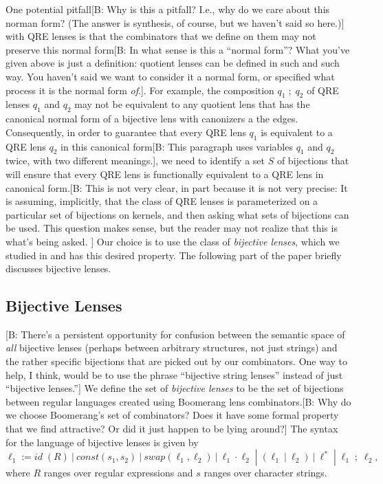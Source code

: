 \documentclass[acmsmall,review,anonymous]{acmart}
\newcommand{\FINISH}[3]{\ifdraft\textcolor{#1}{[#2: #3]}\fi}
\newcommand{\bcp}[1]{\FINISH{dkred}{B}{#1}}
\newcommand{\kw}[1]{\ensuremath{\mathit{#1}}}
\newcommand{\sep}{\ensuremath{\ | \ }}
\newcommand{\const}{\ensuremath{\kw{const}}}
\newcommand{\swap}{\ensuremath{\kw{swap}}}
\begin{document}
One potential pitfall\bcp{Why is this a pitfall?  I.e., why do we care about
this norman form?  (The answer is synthesis, of course, but we haven't said
so here.)} with QRE lenses is that the combinators that
we define on them may not preserve this normal form\bcp{In what sense is
  this a ``normal form''?  What you've given above is just a definition:
  quotient lenses can be defined in such and such way.  You haven't said we
  want to consider it a normal form, or specified what process it is the
  normal form {\em of}.}. For example, the
composition $q_1 \; ; \; q_2$ of QRE lenses $q_1$ and $q_2$ may not be
equivalent to any quotient lens that has the canonical normal form of a
bijective lens with canonizers a the edges. Consequently, in order to guarantee
that every QRE lens $q_1$ is equivalent to a QRE lens $q_2$ in this
canonical form\bcp{This paragraph uses variables $q_1$ and $q_2$ twice, with
two different meanings.}, we need to identify a set $S$ of bijections that
will ensure 
that every QRE lens is functionally equivalent to a QRE lens in canonical
form.\bcp{This is not very clear, in part because it is not very precise:
  It is assuming, implicitly, that the class of QRE lenses is 
  parameterized on a particular set of bijections on kernels, and then
  asking what sets of bijections can be used.  This question makes sense,
  but the reader may not realize that this is what's being asked. } 
Our choice is to use the class of \textit{bijective lenses}, which we studied in
\cite{optician} and has this desired property. The following part of the paper
briefly discusses bijective lenses.

\subsection{Bijective Lenses}
\bcp{There's a persistent opportunity for confusion between the semantic
  space of {\em all} bijective lenses (perhaps between arbitrary structures,
  not just strings) and the rather specific bijections that are picked out
  by our combinators.  One way to help, I think, would be to use the phrase
  ``bijective string lenses'' instead of just ``bijective lenses.''}
We define the set of \textit{bijective lenses} to be the set of bijections
between regular languages created using Boomerang lens combinators.\bcp{Why
  do we choose Boomerang's set of combinators?  Does it have some formal
  property that we find attractive?  Or did it just happen to be lying around?}
The syntax for the language of bijective lenses is given by
$$\ell_1 := \mathit{id} \; (R) \sep \const(s_1, s_2) \sep  \swap(\ell_1,
\ell_2) \sep \ell_1 \cdot \ell_2 \; |  \; (\ell_1 \sep \ell_2) \sep \ell^* \;
| \; \ell_1 \; ; \;  \ell_2,$$ where $R$ ranges over regular expressions and $s$
ranges over character strings.
\end{document}
